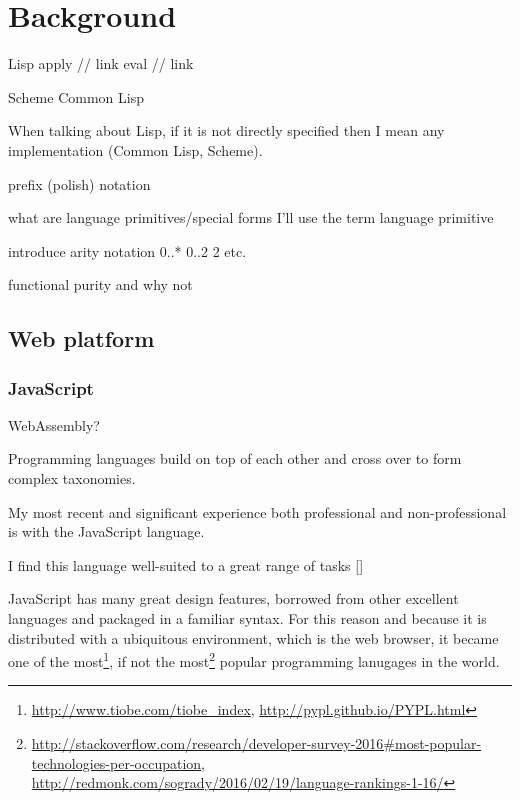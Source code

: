 \chapter{Background}\label{chap:background}

Lisp
    apply // link
    eval // link
    
    Scheme
    Common Lisp

When talking about Lisp, if it is not directly specified then I mean any implementation (Common Lisp, Scheme).

prefix (polish) notation

what are language primitives/special forms
I'll use the term language primitive

introduce arity notation
0..*
0..2
2
etc.

functional purity and why not
\section{Web platform}

\subsection{JavaScript}
WebAssembly?

Programming languages build on top of each other and cross over to form complex taxonomies.

My most recent and significant experience both professional and non-professional is with the JavaScript language.

I find this language well-suited to a great range of tasks []

JavaScript has many great design features, borrowed from other excellent languages and packaged in a familiar syntax. For this reason and because it is distributed with a ubiquitous environment, which is the web browser, it became one of the most\footnote{\url{http://www.tiobe.com/tiobe_index}, \url{http://pypl.github.io/PYPL.html}}, if not the most\footnote{\url{http://stackoverflow.com/research/developer-survey-2016\#most-popular-technologies-per-occupation}, \url{http://redmonk.com/sogrady/2016/02/19/language-rankings-1-16/}} popular programming lanugages in the world.

